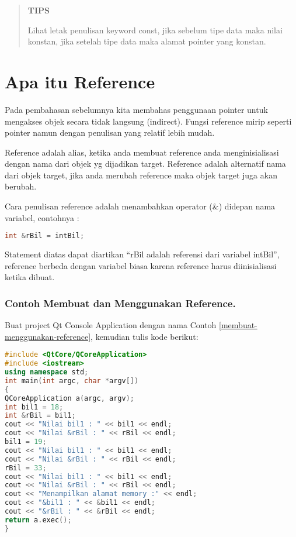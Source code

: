 \begin{quotation}
	\textbf{TIPS}
	
	Lihat
	letak penulisan keyword const, jika sebelum tipe data maka nilai
	konstan, jika setelah tipe data maka alamat pointer yang konstan.
\end{quotation}
 

\section{Apa itu Reference}\label{apa-itu-reference}

Pada pembahasan sebelumnya kita membahas penggunaan pointer untuk
mengakses objek secara tidak langsung (indirect). Fungsi reference mirip
seperti pointer namun dengan penulisan yang relatif lebih mudah.

Reference adalah alias, ketika anda membuat reference anda
menginisialisasi dengan nama dari objek yg dijadikan target. Reference
adalah alternatif nama dari objek target, jika anda merubah reference
maka objek target juga akan berubah.

Cara penulisan reference adalah menambahkan operator (\&) didepan nama
variabel, contohnya :

\begin{lstlisting}[language=c++, numbers=none]
int &rBil = intBil;
\end{lstlisting}

Statement diatas dapat diartikan ``rBil adalah referensi dari variabel
intBil'', reference berbeda dengan variabel biasa karena reference harus
diinisialisasi ketika dibuat.

\subsubsection*{Contoh  Membuat dan Menggunakan Reference.}

Buat project Qt Console Application dengan nama Contoh \ref{membuat-menggunakan-reference}, kemudian tulis
kode berikut:

\begin{lstlisting}[language=c++, caption=Membuat dan Menggunakan Reference, label=membuat-menggunakan-reference]
#include <QtCore/QCoreApplication>
#include <iostream>
using namespace std;
int main(int argc, char *argv[])
{
QCoreApplication a(argc, argv);
int bil1 = 18;
int &rBil = bil1;
cout << "Nilai bil1 : " << bil1 << endl;
cout << "Nilai &rBil : " << rBil << endl;
bil1 = 19;
cout << "Nilai bil1 : " << bil1 << endl;
cout << "Nilai &rBil : " << rBil << endl;
rBil = 33;
cout << "Nilai bil1 : " << bil1 << endl;
cout << "Nilai &rBil : " << rBil << endl;
cout << "Menampilkan alamat memory :" << endl;
cout << "&bil1 : " << &bil1 << endl;
cout << "&rBil : " << &rBil << endl;
return a.exec();
}
\end{lstlisting}

